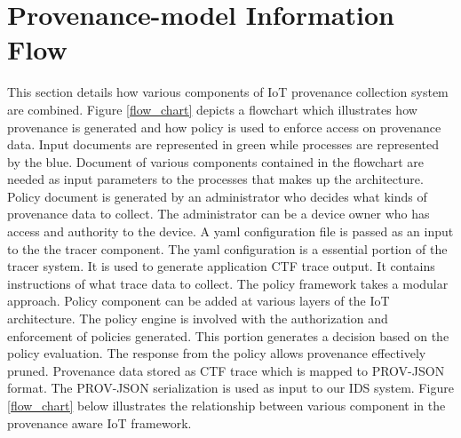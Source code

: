 \section{Provenance-model Information Flow}

This section details how various components of IoT provenance collection system are combined. Figure \ref{flow_chart} depicts a flowchart which illustrates how provenance is generated and how policy is used to enforce access on provenance data. Input documents are represented in green while processes are represented by the blue. Document of various components contained in the flowchart are needed as input parameters to the processes that makes up the architecture. Policy document is generated by an administrator who decides what kinds of provenance data to collect. The administrator can be a device owner who has access and authority to the device. A yaml configuration file is passed as an input to the the tracer component. The yaml configuration is a essential portion of the tracer system.  It is used to generate application CTF trace output. It contains instructions of what trace data to collect. The policy framework takes a modular approach. Policy component can be added at various layers of the IoT architecture. The policy engine is involved with the authorization and enforcement of policies generated. This portion generates a decision based on the policy evaluation. The response from the policy allows provenance effectively pruned. Provenance data stored as CTF trace which is mapped to PROV-JSON format. The PROV-JSON serialization is used as input to our IDS system. Figure \ref{flow_chart} below illustrates the relationship between various component in the provenance aware IoT framework.

